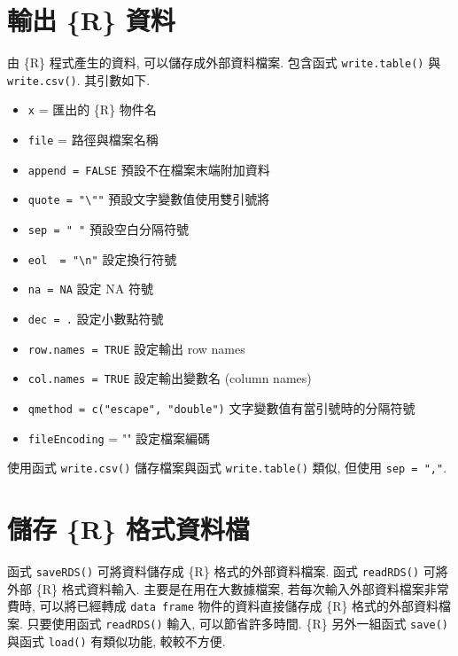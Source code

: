 \documentclass[
]{book}
\providecommand{\tightlist}{%
  \setlength{\itemsep}{0pt}\setlength{\parskip}{0pt}}
\begin{document}
\hypertarget{ux8f38ux51fa-r-ux8cc7ux6599}{%
\section{輸出 \{R\} 資料}\label{ux8f38ux51fa-r-ux8cc7ux6599}}

由 \{R\} 程式產生的資料, 可以儲存成外部資料檔案.
包含函式 \texttt{write.table()} 與 \texttt{write.csv()}.
其引數如下.

\begin{itemize}
\tightlist
\item
  \texttt{x} = 匯出的 \{R\} 物件名
\item
  \texttt{file} = 路徑與檔案名稱
\item
  \texttt{append\ =\ FALSE} 預設不在檔案末端附加資料
\item
  \texttt{quote\ =\ "\textbackslash{}""} 預設文字變數值使用雙引號將
\item
  \texttt{sep\ =\ "\ "} 預設空白分隔符號
\item
  \texttt{eol\ \ =\ "\textbackslash{}n"} 設定換行符號
\item
  \texttt{na\ =\ NA} 設定 NA 符號
\item
  \texttt{dec\ =\ \textquotesingle{}.\textquotesingle{}} 設定小數點符號
\item
  \texttt{row.names\ =\ TRUE} 設定輸出 row names
\item
  \texttt{col.names\ =\ TRUE} 設定輸出變數名 (column names)
\item
  \texttt{qmethod\ =\ c("escape",\ "double")} 文字變數值有當引號時的分隔符號
\item
  \texttt{fileEncoding} = "" 設定檔案編碼
\end{itemize}

使用函式 \texttt{write.csv()} 儲存檔案與函式 \texttt{write.table()} 類似,
但使用 \texttt{sep\ =\ ","}.

\hypertarget{ux5132ux5b58-r-ux683cux5f0fux8cc7ux6599ux6a94}{%
\section{儲存 \{R\} 格式資料檔}\label{ux5132ux5b58-r-ux683cux5f0fux8cc7ux6599ux6a94}}

函式 \texttt{saveRDS()} 可將資料儲存成 \{R\} 格式的外部資料檔案.
函式 \texttt{readRDS()} 可將外部 \{R\} 格式資料輸入.
主要是在用在大數據檔案,
若每次輸入外部資料檔案非常費時,
可以將已經轉成 \texttt{data\ frame} 物件的資料直接儲存成 \{R\} 格式的外部資料檔案.
只要使用函式 \texttt{readRDS()} 輸入, 可以節省許多時間.
\{R\} 另外一組函式 \texttt{save()} 與函式 \texttt{load()} 有類似功能,
較較不方便.
\end{document}

